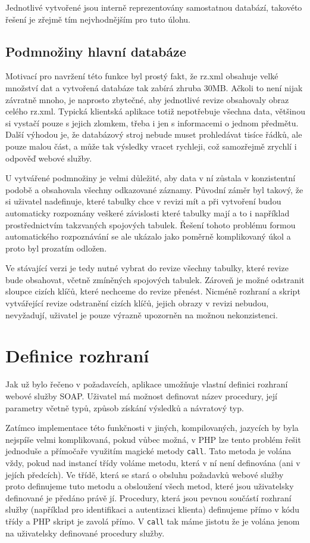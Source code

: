 \documentclass[11pt,twoside,a4paper]{book}
\begin{document}
Jednotlivé vytvořené jsou interně reprezentovány samostatnou databází, takovéto řešení je zřejmě tím nejvhodnějším pro tuto úlohu.

\subsection{Podmnožiny hlavní databáze}

Motivací pro navržení této funkce byl prostý fakt, že rz.xml obsahuje velké množství dat a vytvořená databáze tak zabírá zhruba 30MB. Ačkoli to není nijak závratně mnoho, je naprosto zbytečné, aby jednotlivé revize obsahovaly obraz celého rz.xml. Typická klientská aplikace totiž nepotřebuje všechna data, většinou si vystačí pouze s jejich zlomkem, třeba i jen s informacemi o jednom předmětu. Další výhodou je, že databázový stroj nebude muset prohledávat tisíce řádků, ale pouze malou část, a může tak výsledky vracet rychleji, což samozřejmě zrychlí i odpověď webové služby.

U vytvářené podmnožiny je velmi důležité, aby data v ní zůstala v konzistentní podobě a obsahovala všechny odkazované záznamy. Původní záměr byl takový, že si uživatel nadefinuje, které tabulky chce v revizi mít a při vytvoření budou automaticky rozpoznány veškeré závislosti které tabulky mají a to i například prostřednictvím takzvaných spojových tabulek. Řešení tohoto problému formou automatického rozpoznávání se ale ukázalo jako poměrně komplikovaný úkol a proto byl prozatím odložen.

Ve stávající verzi je tedy nutné vybrat do revize všechny tabulky, které revize bude obsahovat, včetně zmíněných spojových tabulek. Zároveň je možné odstranit sloupce cizích klíčů, které nechceme do revize přenést. Nicméně rozhraní a skript vytvářející revize odstranění cizích klíčů, jejich obrazy v revizi nebudou, nevyžadují, uživatel je pouze výrazně upozorněn na možnou nekonzistenci.

\section{Definice rozhraní}

Jak už bylo řečeno v požadavcích, aplikace umožňuje vlastní definici rozhraní webové služby SOAP. Uživatel má možnost definovat název procedury, její parametry včetně typů, způsob získání výsledků a návratový typ.

Zatímco implementace této funkčnosti v jiných, kompilovaných, jazycích by byla nejspíše velmi komplikovaná, pokud vůbec možná, v PHP lze tento problém řešit jednoduše a přímočaře využitím magické metody \texttt{call}. Tato metoda je volána vždy, pokud nad instancí třídy voláme metodu, která v ní není definována (ani v jejích předcích). Ve třídě, která se stará o obsluhu požadavků webové služby proto definujeme tuto metodu a obsloužení všech metod, které jsou uživatelsky definované je předáno právě jí. Procedury, která jsou pevnou součástí rozhraní služby (například pro identifikaci a autentizaci klienta) definujeme přímo v kódu třídy a PHP skript je zavolá přímo. V \texttt{call} tak máme jistotu že je volána jenom na uživatelsky definované procedury služby.
\end{document}
